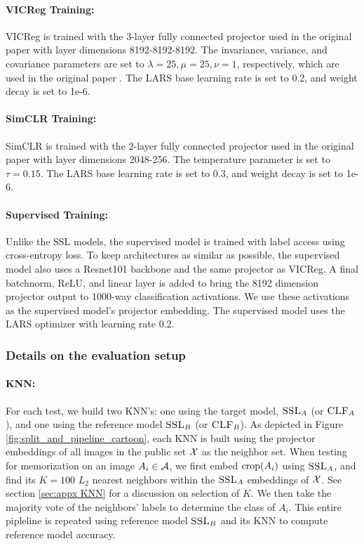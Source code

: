 \paragraph{VICReg Training:} VICReg is trained with the 3-layer fully connected projector used in the original paper with layer dimensions 8192-8192-8192. The invariance, variance, and covariance parameters are set to $\lambda = 25, \mu = 25, \nu = 1$, respectively, which are used in the original paper \citep{vicreg}. The LARS base learning rate is set to 0.2, and weight decay is set to 1e-6. 

\paragraph{SimCLR Training:} SimCLR is trained with the 2-layer fully connected projector used in the original paper with layer dimensions 2048-256. The temperature parameter is set to $\tau=0.15$. The LARS base learning rate is set to 0.3, and weight decay is set to 1e-6. 

\paragraph{Supervised Training:} Unlike the SSL models, the supervised model is trained with label access using cross-entropy loss. To keep architectures as similar as possible, the supervised model also uses a Resnet101 backbone and the same projector as VICReg. A final batchnorm, ReLU, and linear layer is added to bring the 8192 dimension projector output to 1000-way classification activations. We use these activations as the supervised model's projector embedding. The supervised model uses the LARS optimizer with learning rate 0.2. 

\subsubsection{Details on the evaluation setup}
\paragraph{KNN:} For each test, we build two KNN's: one using the target model, $\textsc{SSL}_A$ (or $\textsc{CLF}_A$), and one using the reference model $\textsc{SSL}_B$ (or $\textsc{CLF}_B$). As depicted in Figure \ref{fig:split_and_pipeline_cartoon}, each KNN is built  using the projector embeddings of all images in the public set $\mathcal{X}$ as the neighbor set. When testing for memorization on an image $A_i \in \mathcal{A}$, we first embed $\mathrm{crop}({A_i})$ using $\textsc{SSL}_A$, and find its $K = 100$ $L_2$ nearest neighbors within the $\textsc{SSL}_A$ embeddings of $\mathcal{X}$. See section \ref{sec:appx KNN} for a discussion on selection of $K$. We then take the majority vote of the neighbors' labels to determine the class of $A_i$. This entire pipleline is repeated using reference model $\textsc{SSL}_B$ and its KNN to compute reference model accuracy. 

